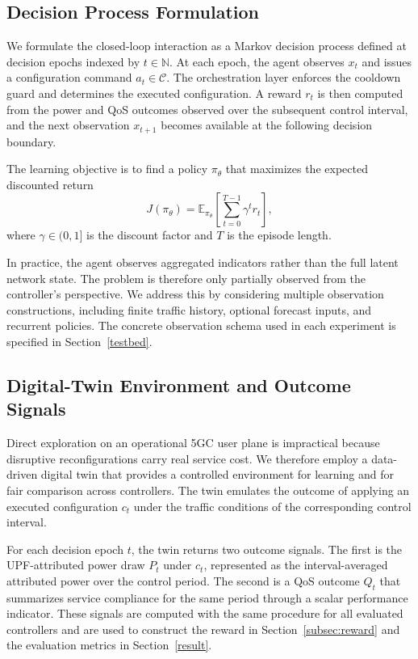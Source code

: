 \documentclass[a4paper,fleqn]{cas-sc}
\begin{document}
\subsection{Decision Process Formulation}
\label{subsec:mdp_formulation}

We formulate the closed-loop interaction as a Markov decision process defined at decision epochs indexed by $t\in\mathbb{N}$. At each epoch, the agent observes $x_t$ and issues a configuration command $a_t\in\mathcal{C}$. The orchestration layer enforces the cooldown guard and determines the executed configuration. A reward $r_t$ is then computed from the power and QoS outcomes observed over the subsequent control interval, and the next observation $x_{t+1}$ becomes available at the following decision boundary.

The learning objective is to find a policy $\pi_\theta$ that maximizes the expected discounted return
\begin{equation}
J(\pi_\theta)=\mathbb{E}_{\pi_\theta}\!\left[\sum_{t=0}^{T-1}\gamma^t r_t\right],
\label{eq:return}
\end{equation}
where $\gamma\in(0,1]$ is the discount factor and $T$ is the episode length.

In practice, the agent observes aggregated indicators rather than the full latent network state. The problem is therefore only partially observed from the controller's perspective. We address this by considering multiple observation constructions, including finite traffic history, optional forecast inputs, and recurrent policies. The concrete observation schema used in each experiment is specified in Section~\ref{testbed}.

\subsection{Digital-Twin Environment and Outcome Signals}
\label{subsec:digital_twin}

Direct exploration on an operational 5GC user plane is impractical because disruptive reconfigurations carry real service cost. We therefore employ a data-driven digital twin that provides a controlled environment for learning and for fair comparison across controllers. The twin emulates the outcome of applying an executed configuration $c_t$ under the traffic conditions of the corresponding control interval.

For each decision epoch $t$, the twin returns two outcome signals. The first is the UPF-attributed power draw $P_t$ under $c_t$, represented as the interval-averaged attributed power over the control period. The second is a QoS outcome $Q_t$ that summarizes service compliance for the same period through a scalar performance indicator. These signals are computed with the same procedure for all evaluated controllers and are used to construct the reward in Section~\ref{subsec:reward} and the evaluation metrics in Section~\ref{result}.
\end{document}
